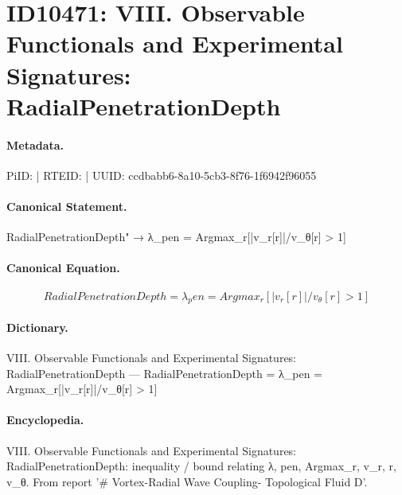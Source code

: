\section*{ID10471: VIII. Observable Functionals and Experimental Signatures: RadialPenetrationDepth}
\paragraph{Metadata.}
PiID:  | RTEID:  | UUID: ccdbabb6-8a10-5cb3-8f76-1f6942f96055

\paragraph{Canonical Statement.}
RadialPenetrationDepth" → λ\_pen = Argmax\_r[|v\_r[r]|/v\_θ[r] > 1]

\paragraph{Canonical Equation.}
\[
RadialPenetrationDepth = λ_pen = Argmax_r[|v_r[r]|/v_θ[r] > 1]
\]

\paragraph{Dictionary.}
VIII. Observable Functionals and Experimental Signatures: RadialPenetrationDepth — RadialPenetrationDepth = λ\_pen = Argmax\_r[|v\_r[r]|/v\_θ[r] > 1]

\paragraph{Encyclopedia.}
VIII. Observable Functionals and Experimental Signatures: RadialPenetrationDepth: inequality / bound relating λ, pen, Argmax\_r, v\_r, r, v\_θ. From report '\# Vortex-Radial Wave Coupling- Topological Fluid D'.
